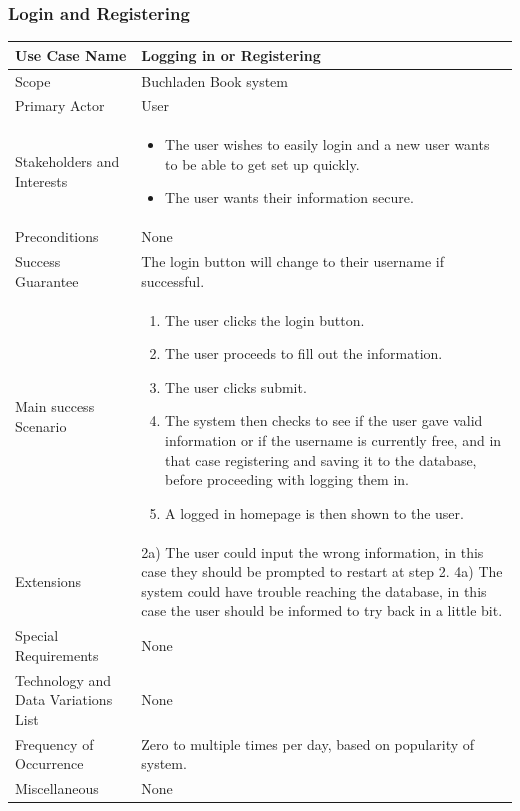 \documentclass[11pt]{article}
\begin{document}
	\subsubsection{Login and Registering}
		\begin{longtable}{| l | p{8cm} |}
			\hline
			Use Case Name & Logging in or Registering \\ \hline
			Scope & Buchladen Book system \\ \hline
			Primary Actor & User \\ \hline
			Stakeholders and Interests & \begin{itemize}
							\item The user wishes to easily login and a new user wants to be able to get set up quickly.
							\item The user wants their information secure.
						     \end{itemize} \\ \hline
			Preconditions & None \\ \hline
			Success Guarantee & The login button will change to their username if successful. \\ \hline
			Main success Scenario & \begin{enumerate}
							\item The user clicks the login button.
							\item The user proceeds to fill out the information.
							\item The user clicks submit.
							\item The system then checks to see if the user gave valid information or if the username is currently free, and in that case registering and saving it to the database, before proceeding with logging them in.
							\item A logged in homepage is then shown to the user.
						\end{enumerate} \\ \hline
			Extensions & 2a) The user could input the wrong information, in this case they should be prompted to restart at step 2. \newline 4a) The system could have trouble reaching the database, in this case the user should be informed to try back in a little bit. \\ \hline
			Special Requirements & None \\ \hline
			Technology and Data Variations List & None \\ \hline
			Frequency of Occurrence & Zero to multiple times per day, based on popularity of system. \\ \hline
			Miscellaneous & None \\ \hline
		\end{longtable}
\end{document}
